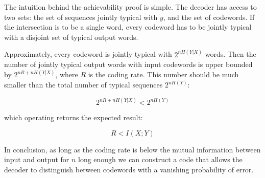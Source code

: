 The intuition behind the achievability proof is simple. The decoder has access to two sets: the set of sequences jointly typical with ${y}$, and the set of codewords. If the intersection is to be a single word, every codeword has to be jointly typical with a disjoint set of typical output words. 

Approximately, every codeword is jointly typical with $2^{nH(Y|X)}$ words. Then the number of jointly typical output words with input codewords is upper bounded by $2^{nR+nH(Y|X)}$, where $R$ is the coding rate. This number should be much smaller than the total number of typical sequences $2^{nH(Y)}$:
 
\begin{equation*}
2^{nR+nH(Y|X)} < 2^{nH(Y)}
\end{equation*}

\noindent which operating returns the expected result:

\begin{equation*}
R < I(X;Y)
\end{equation*}

In conclusion, as long as the coding rate is below the mutual information between input and output for $n$ long enough we can construct a code that allows the decoder to distinguish between codewords with a vanishing probability of error.
\fi

